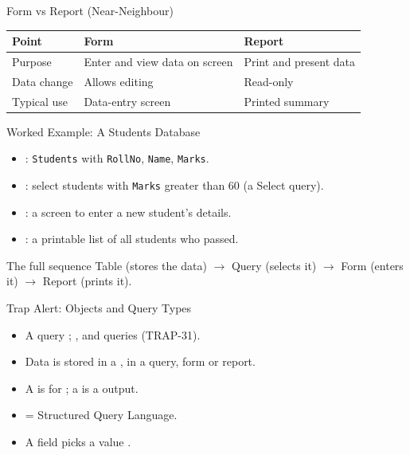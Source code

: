 \documentclass[aspectratio=169]{beamer}
\begin{document}
\begin{frame}{Form vs Report (Near-Neighbour)}
  \begin{center}
    \begin{tabular}{p{}p{}p{}}
      \toprule
      \textbf{Point} & \textbf{Form} & \textbf{Report} \\
      \midrule
      Purpose & Enter and view data on screen & Print and present data \\
      Data change & Allows editing & Read-only \\
      Typical use & Data-entry screen & Printed summary \\
      \bottomrule
    \end{tabular}
  \end{center}
  \vspace{0.25cm}
\end{frame}

\begin{frame}{Worked Example: A Students Database}
  \begin{itemize}
    \item {}: \texttt{Students} with \texttt{RollNo},
      \texttt{Name}, \texttt{Marks}.
    \item {}: select students with \texttt{Marks} greater than 60
      (a Select query).
    \item {}: a screen to enter a new student's details.
    \item {}: a printable list of all students who passed.
  \end{itemize}
  \begin{exampleblock}{The full sequence}
    Table (stores the data) $\rightarrow$ Query (selects it) $\rightarrow$
    Form (enters it) $\rightarrow$ Report (prints it).
  \end{exampleblock}
\end{frame}

\begin{frame}{Trap Alert: Objects and Query Types}
  \begin{itemize}
    \item A  query ; , 
      and  queries  (TRAP-31).
    \item Data is stored in a ,  in a query, form or
      report.
    \item A  is for ; a  is a
       output.
    \item {} = Structured Query Language.
    \item A  field picks a value .
  \end{itemize}
\end{frame}
\end{document}
